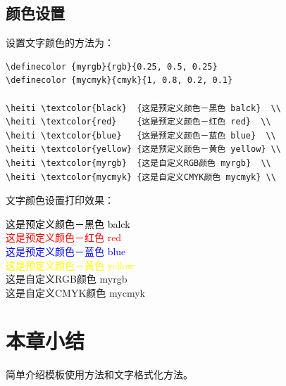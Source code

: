 \subsection{颜色设置}

设置文字颜色的方法为：
\begin{lstlisting}
\definecolor {myrgb}{rgb}{0.25, 0.5, 0.25}
\definecolor {mycmyk}{cmyk}{1, 0.8, 0.2, 0.1}

\heiti \textcolor{black}  {这是预定义颜色－黑色 balck}  \\
\heiti \textcolor{red}    {这是预定义颜色－红色 red}  \\
\heiti \textcolor{blue}   {这是预定义颜色－蓝色 blue}  \\
\heiti \textcolor{yellow} {这是预定义颜色－黄色 yellow} \\
\heiti \textcolor{myrgb}  {这是自定义RGB颜色 myrgb}  \\
\heiti \textcolor{mycmyk} {这是自定义CMYK颜色 mycmyk} \\
\end{lstlisting}


文字颜色设置打印效果：
\begin{flushleft}
  \xiaosan
  {

    \heiti \textcolor{black}  {这是预定义颜色－黑色 balck}  \\
    \heiti \textcolor{red}    {这是预定义颜色－红色 red}  \\
    \heiti \textcolor{blue}   {这是预定义颜色－蓝色 blue}  \\
    \heiti \textcolor{yellow} {这是预定义颜色－黄色 yellow} \\
    \heiti \textcolor{myrgb}  {这是自定义RGB颜色 myrgb}  \\
    \heiti \textcolor{mycmyk} {这是自定义CMYK颜色 mycmyk} \\
  }
\end{flushleft}

\section{本章小结}
简单介绍模板使用方法和文字格式化方法。
